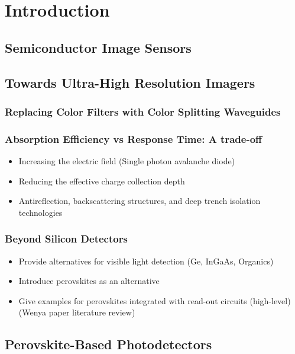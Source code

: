 \chapter{Introduction}\label{ch:introduction}

\instructionsintroduction
\section{Semiconductor Image Sensors}

\section{Towards Ultra-High Resolution Imagers}

\subsection{Replacing Color Filters with Color Splitting Waveguides}
\subsection{Absorption Efficiency vs Response Time: A trade-off}

\begin{itemize}
    \item Increasing the electric field (Single photon avalanche diode)
    \item Reducing the effective charge collection depth
    \item Antireflection, backscattering structures, and deep trench isolation technologies
\end{itemize}

\subsection{Beyond Silicon Detectors}
\begin{itemize}
    \item Provide alternatives for visible light detection (Ge, InGaAs, Organics)
    \item Introduce perovskites as an alternative
    \item Give examples for perovskites integrated with read-out circuits (high-level) (Wenya paper literature review)
\end{itemize}


\section{Perovskite-Based Photodetectors}

